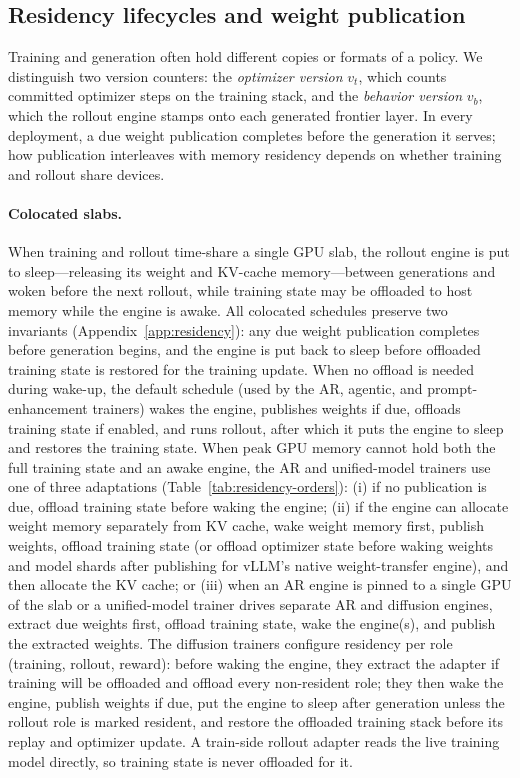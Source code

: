 \documentclass[10pt]{article}
\begin{document}
\subsection{Residency lifecycles and weight publication}
\label{sec:lifecycle}

Training and generation often hold different copies or formats of a policy.
We distinguish two version counters: the \emph{optimizer version} $v_t$, which counts committed optimizer steps on the training stack, and the \emph{behavior version} $v_b$, which the rollout engine stamps onto each generated frontier layer.
In every deployment, a due weight publication completes before the generation it serves; how publication interleaves with memory residency depends on whether training and rollout share devices.

\paragraph{Colocated slabs.}
When training and rollout time-share a single GPU slab, the rollout engine is put to sleep---releasing its weight and KV-cache memory---between generations and woken before the next rollout, while training state may be offloaded to host memory while the engine is awake.
All colocated schedules preserve two invariants (Appendix~\ref{app:residency}): any due weight publication completes before generation begins, and the engine is put back to sleep before offloaded training state is restored for the training update.
When no offload is needed during wake-up, the default schedule (used by the AR, agentic, and prompt-enhancement trainers) wakes the engine, publishes weights if due, offloads training state if enabled, and runs rollout, after which it puts the engine to sleep and restores the training state.
When peak GPU memory cannot hold both the full training state and an awake engine, the AR and unified-model trainers use one of three adaptations (Table~\ref{tab:residency-orders}): (i) if no publication is due, offload training state before waking the engine; (ii) if the engine can allocate weight memory separately from KV cache, wake weight memory first, publish weights, offload training state (or offload optimizer state before waking weights and model shards after publishing for vLLM's native weight-transfer engine), and then allocate the KV cache; or (iii) when an AR engine is pinned to a single GPU of the slab or a unified-model trainer drives separate AR and diffusion engines, extract due weights first, offload training state, wake the engine(s), and publish the extracted weights.
The diffusion trainers configure residency per role (training, rollout, reward): before waking the engine, they extract the adapter if training will be offloaded and offload every non-resident role; they then wake the engine, publish weights if due, put the engine to sleep after generation unless the rollout role is marked resident, and restore the offloaded training stack before its replay and optimizer update.
A train-side rollout adapter reads the live training model directly, so training state is never offloaded for it.
\end{document}
